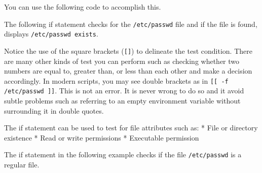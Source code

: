 You can use the following code to accomplish this.

\begin{Shaded}
\begin{Highlighting}[]
 
 
\KeywordTok{if [}   \KeywordTok{ ]}
   
\KeywordTok{elif [}   \KeywordTok{ ]}
   
   
\end{Highlighting}
\end{Shaded}

The following if statement checks for the \texttt{/etc/passwd} file and
if the file is found, displays \texttt{/etc/passwd exists}.

\begin{Shaded}
\begin{Highlighting}[]
\KeywordTok{if [}  \KeywordTok{ ]}
   
\end{Highlighting}
\end{Shaded}

Notice the use of the square brackets (\texttt{{[}{]}}) to delineate the
test condition. There are many other kinds of test you can perform such
as checking whether two numbers are equal to, greater than, or less than
each other and make a decision accordingly. In modern scripts, you may
see double brackets as in \texttt{{[}{[} -f /etc/passwd {]}{]}}. This is
not an error. It is never wrong to do so and it avoid subtle problems
such as referring to an empty environment variable without surrounding
it in double quotes.

The if statement can be used to test for file attributes such as: * File
or directory existence * Read or write permissions * Executable
permission

The if statement in the following example checks if the file
\texttt{/etc/passwd} is a regular file.

\begin{Shaded}
\begin{Highlighting}[]
\KeywordTok{if [}  \KeywordTok{ ]} \NormalTok{; }
\end{Highlighting}
\end{Shaded}

